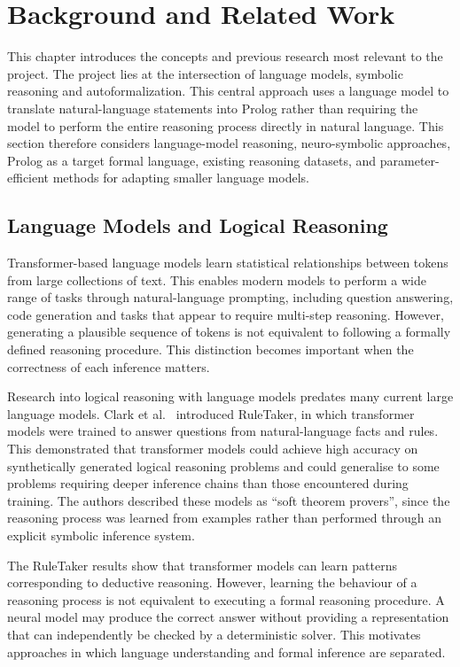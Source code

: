 \documentclass[11pt]{article} %
\theoremstyle{plain}
\theoremstyle{definition}
\begin{document}
\clearpage
\section{Background and Related Work}

This chapter introduces the concepts and previous research most relevant to the
project. The project lies at the intersection of language models, symbolic
reasoning and autoformalization. This central approach uses a language model to
translate natural-language statements into Prolog rather than requiring the
model to perform the entire reasoning process directly in natural language.
This section therefore considers language-model reasoning, neuro-symbolic
approaches, Prolog as a target formal language, existing reasoning datasets,
and parameter-efficient methods for adapting smaller language models.


\subsection{Language Models and Logical Reasoning}

Transformer-based language models learn statistical relationships between
tokens from large collections of text. This enables modern models to perform a
wide range of tasks through natural-language prompting, including question
answering, code generation and tasks that appear to require multi-step
reasoning. However, generating a plausible sequence of tokens is not equivalent
to following a formally defined reasoning procedure. This distinction becomes
important when the correctness of each inference matters.

Research into logical reasoning with language models predates many current
large language models. Clark et al.~\cite{clark2020ruletaker} introduced RuleTaker, in which
transformer models were trained to answer questions from natural-language facts
and rules. This demonstrated that transformer models could achieve high
accuracy on synthetically generated logical reasoning problems and could
generalise to some problems requiring deeper inference chains than those
encountered during training. The authors described these models as ``soft
theorem provers'', since the reasoning process was learned from examples rather
than performed through an explicit symbolic inference system.

The RuleTaker results show that transformer models can learn patterns
corresponding to deductive reasoning. However, learning the behaviour of
a reasoning process is not equivalent to executing a formal reasoning
procedure. A neural model may produce the correct answer without
providing a representation that can independently be checked by a
deterministic solver. This motivates approaches in which language
understanding and formal inference are separated.
\end{document}
